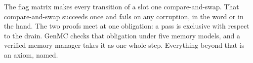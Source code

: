 The flag matrix makes every transition of a slot one compare-and-swap. That compare-and-swap succeeds once and fails on any corruption, in the word or in the hand. The two proofs meet at one obligation: a pass is exclusive with respect to the drain. GenMC checks that obligation under five memory models, and a verified memory manager takes it as one whole step. Everything beyond that is an axiom, named.
